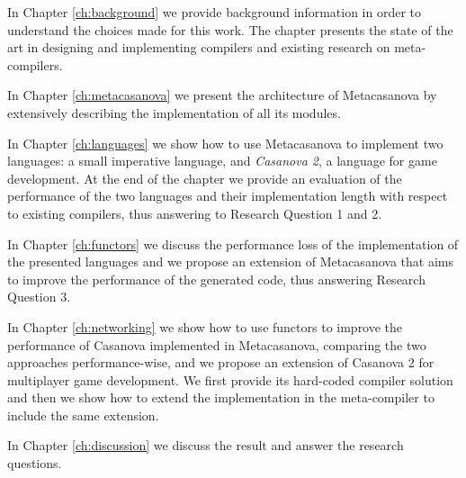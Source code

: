 In Chapter \ref{ch:background} we provide background information in order to understand the choices made for this work. The chapter presents the state of the art in designing and implementing compilers and existing research on meta-compilers.

In Chapter \ref{ch:metacasanova} we present the architecture of Metacasanova by extensively describing the implementation of all its modules.

In Chapter \ref{ch:languages} we show how to use Metacasanova to implement two languages: a small imperative language, and \textit{Casanova 2}, a language for game development. At the end of the chapter we provide an evaluation of the performance of the two languages and their implementation length with respect to existing compilers, thus answering to Research Question 1 and 2.

In Chapter \ref{ch:functors} we discuss the performance loss of the implementation of the presented languages and we propose an extension of Metacasanova that aims to improve the performance of the generated code, thus answering Research Question 3.

In Chapter \ref{ch:networking} we show how to use functors to improve the performance of Casanova implemented in Metacasanova, comparing the two approaches performance-wise, and we propose an extension of Casanova 2 for multiplayer game development. We first provide its hard-coded compiler solution and then we show how to extend the implementation in the meta-compiler to include the same extension.

In Chapter \ref{ch:discussion} we discuss the result and answer the research questions.